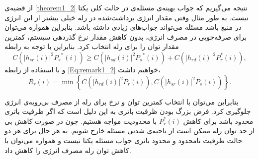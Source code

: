 \begin{remark}
از قضیه‌ی
\ref{theorem1_2}
نتیجه می‌گیریم که جواب بهینه‌ی مسئله‌ی
در حالت کلی یکتا نیست. به طور مثال وقتی مقدار انرژی برداشت‌شده در رله خیلی بیشتر از این انرژی در منبع باشد مسئله می‌تواند جواب‌های زیادی داشته باشد. بنابراین همواره می‌توان برای صرفه‌جویی در مصرف انرژی، بدون کاهش مقدار نرخ گذردهی سیستم، کمترین مقدار توان را برای رله انتخاب کرد. بنابراین با توجه به رابطه
\begin{equation}
C\left( {{{\left| {{h_{sr}}\left( i \right)} \right|}^2}{P_s}^*\left( i \right)} \right) 
\ge C\left( {{{\left| {{h_{sd}}\left( i \right)} \right|}^2}{P_s}^*\left( i \right)} \right) + C\left( {{{\left| {{h_{rd}}\left( {i} \right)} \right|}^2}P_r^*\left( {i} \right)} \right),
\label{Eq:remark1_2}
\end{equation}
و با  استفاده از رابطه
\ref{Eq:remark1_2}
خواهیم داشت،
\begin{equation}
{R_r}(i) = \min \left\{ {C\left( {{{\left| {{h_{rd}}(i)} \right|}^2}{P_r}(i)} \right),C\left( {{{\left| {{h_{sr}}(i)} \right|}^2}{P_s}(i)} \right)} \right\}.
\end{equation}

بنابراین می‌توان با انتخاب کمترین توان و نرخ برای رله از مصرف بی‌رویه‌ی انرژی جلوگیری کرد. فرض بزرگ بودن ظرفیت باتری‌ به این دلیل است که اگر ظرفیت باتری محدود باشد برای کاهش
$P_r^*(i)$
با محدودیت مواجه هستیم. چون در صورت کاهش بی از حد توان رله ممکن است از ناحیه‌ی شدنی مسئله خارج شویم. به هر حال برای هر دو حالت ظرفیت نامحدود و محدود باتری جواب مسئله یکتا نیست و همواره می‌توان با کاهش توان رله مصرف انرژی را کاهش داد.
\end{remark}









